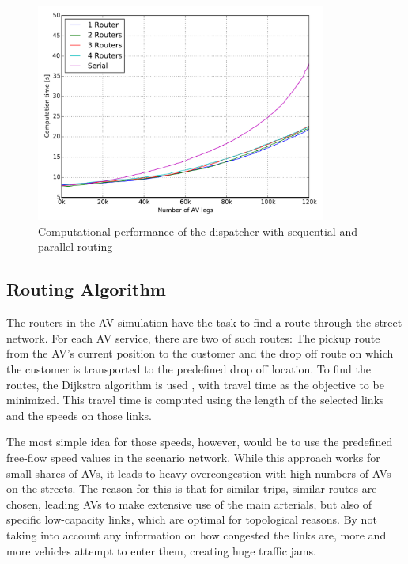 \begin{figure}
    \centering
    \includegraphics[width=0.85\textwidth]{figures/routers.pdf}
    \caption{Computational performance of the dispatcher with sequential and parallel routing}
    \label{fig:routers}
\end{figure}

\subsection{Routing Algorithm}
\label{sec:routing}

The routers in the AV simulation have the task to find a route through the street
network. For each AV service, there are two of such routes: The pickup route from
the AV's current position to the customer and the drop off route on which the customer
is transported to the predefined drop off location. To find the routes, the Dijkstra algorithm is used \citep{Dijkstra}, with
travel time as the objective to be minimized. This travel time is computed using
the length of the selected links and the speeds on those links.

The most simple idea for those speeds, however, would be to use the predefined free-flow speed values in
the scenario network. While this approach works for small shares of AVs, it leads
to heavy overcongestion with high numbers of AVs on the streets. The reason
for this is that for similar trips, similar routes are chosen, leading AVs to make
extensive use of the main arterials, but also of specific low-capacity links, which
are optimal for topological reasons. By not taking into account any information
on how congested the links are, more and more vehicles attempt to enter
them, creating huge traffic jams.

